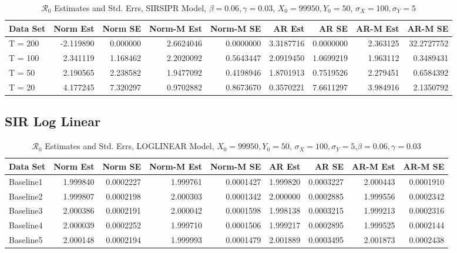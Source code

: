 \documentclass[12pt]{article}
\newcommand{\rr}{\ensuremath{\mathcal{R}_0}}
\begin{document}
\begin{table}[H]
	
	\caption{\label{tab:}$\rr$ Estimates and Std. Errs, SIRSIPR Model,
		$\beta = 0.06, \gamma = 0.03$, $X_0 = 99950, Y_0 = 50$, $\sigma_X = 100, \sigma_Y = 5$}
	\centering
	\begin{tabular}[t]{l|r|r|r|r|r|r|r|r}
		\hline
		Data Set & Norm Est & Norm SE & Norm-M Est & Norm-M SE & AR Est & AR SE & AR-M Est & AR-M SE\\
		\hline
		T = 200 & -2.119890 & 0.000000 & 2.6624046 & 0.0000000 & 3.3187716 & 0.0000000 & 2.363125 & 32.2727752\\
		\hline
		T = 100 & 2.341119 & 1.168462 & 2.2020092 & 0.5643447 & 2.0919450 & 1.0699219 & 1.963112 & 0.3489431\\
		\hline
		T = 50 & 2.190565 & 2.238582 & 1.9477092 & 0.4198946 & 1.8701913 & 0.7519526 & 2.279451 & 0.6584392\\
		\hline
		T = 20 & 4.177245 & 7.320297 & 0.9702882 & 0.8673670 & 0.3570221 & 7.6611297 & 3.984916 & 2.1350792\\
		\hline
	\end{tabular}
\end{table}

\subsection{SIR Log Linear}

\begin{table}[H]
	
	\caption{\label{tab:}$\rr$ Estimates and Std. Errs, LOGLINEAR Model,
		$X_0 = 99950, Y_0 = 50$, $\sigma_X = 100, \sigma_Y = 5$,$\beta = 0.06, \gamma = 0.03$}
	\centering
	\begin{footnotesize}
		\begin{tabular}[t]{l|r|r|r|r|r|r|r|r}
			\hline
			Data Set & Norm Est & Norm SE & Norm-M Est & Norm-M SE & AR Est & AR SE & AR-M Est & AR-M SE\\
			\hline
			Baseline1 & 1.999840 & 0.0002227 & 1.999761 & 0.0001427 & 1.999820 & 0.0003227 & 2.000443 & 0.0001910\\
			\hline
			Baseline2 & 1.999807 & 0.0002198 & 2.000303 & 0.0001342 & 2.000000 & 0.0002885 & 1.999556 & 0.0002342\\
			\hline
			Baseline3 & 2.000386 & 0.0002191 & 2.000042 & 0.0001598 & 1.998138 & 0.0003215 & 1.999213 & 0.0002316\\
			\hline
			Baseline4 & 2.000039 & 0.0002252 & 1.999710 & 0.0001506 & 1.999217 & 0.0002895 & 1.999525 & 0.0002144\\
			\hline
			Baseline5 & 2.000148 & 0.0002194 & 1.999993 & 0.0001479 & 2.001889 & 0.0003495 & 2.001873 & 0.0002438\\
			\hline
		\end{tabular}
	\end{footnotesize}
\end{table}
\end{document}
